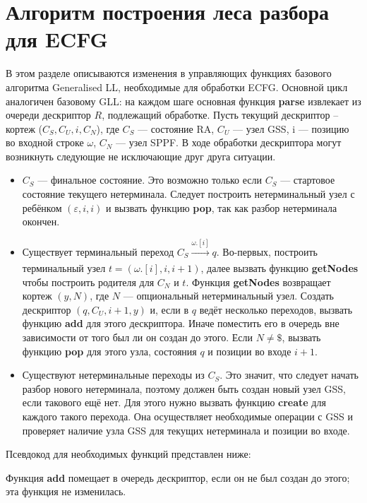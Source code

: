 \documentclass[14pt]{matmex-diploma-custom}
\begin{document}
	\section{Алгоритм построения леса разбора для ECFG}
	В этом разделе описываются изменения в управляющих функциях базового алгоритма 
	Generalised LL, необходимые для обработки ECFG. Основной цикл аналогичен базовому
	GLL: на каждом шаге основная функция \textbf{parse} извлекает из очереди дескриптор
	$R$, подлежащий обработке. Пусть текущий дескриптор -- кортеж ($C_S, C_U, i, C_N$),
	где $C_S$ --- состояние RA, $C_U$ --- узел GSS, i --- позицию во входной строке 
	$\omega$, $C_N$ --- узел SPPF. В ходе обработки дескриптора могут возникнуть следующие
	не исключающие друг друга ситуации.
	\begin{itemize} 
		\item $C_S$ --- финальное состояние. Это возможно только если $C_S$
		--- стартовое состояние текущего нетерминала. Следует построить нетерминальный
		узел с ребёнком $(\varepsilon, i, i)$ и вызвать функцию \textbf{pop}, так как
		разбор нетерминала окончен.
		
		\item Существует терминальный переход $C_S \xrightarrow[]{\omega.[i]} q$.
		Во-первых, построить терминальный узел $ t = (\omega.[i], i, i+1) $, далее 
		вызвать функцию \textbf{getNodes} чтобы построить родителя для $ C_N $ и $ t $. 
		Функция \textbf{getNodes} возвращает кортеж $ (y, N) $, где $N$ --- опциональный
		нетерминальный узел. Создать дескриптор $ (q, C_U, i+1, y) $ и, если
        в $q$ ведёт несколько переходов, вызвать функцию \textbf{add} для этого дескриптора.
        Иначе поместить его в очередь вне зависимости от того был ли он создан до этого. 
        Если $ N \neq \$$,
		вызвать функцию \textbf{pop} для этого узла, состояния $ q $ и позиции во
		входе $ i + 1 $.
		
		\item Существуют нетерминальные переходы из $C_S$.
		Это значит, что следует начать разбор нового нетерминала, поэтому должен быть
		создан новый узел GSS, если такового ещё нет. Для этого нужно вызвать функцию
		\textbf{create} для каждого такого перехода. Она осуществляет необходимые
		операции с GSS и проверяет наличие узла GSS для текущих нетерминала и 
		позиции во входе.
	\end{itemize}
	Псевдокод для необходимых функций представлен ниже:
	
	Функция \textbf{add} помещает в очередь дескриптор, если он не был создан до этого; эта функция не изменилась.
	
	
\end{document}
